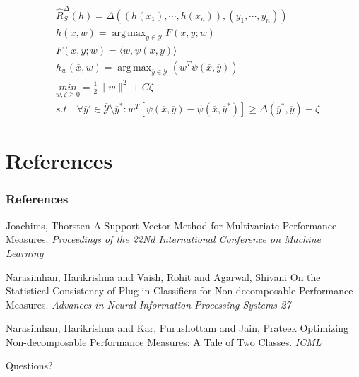 \documentclass{beamer}
\DeclareMathOperator*{\argmax}{arg\,max}
\begin{document}

\begin{frame}
	\frametitle{}
	\begin{equation*}
	\begin{split}
	& \hat{R}_S^\Delta(h) = \Delta ((h(x_1), \cdots, h(x_n)), (y_1, \cdots, y_n))\\
	& h(x,w) = \argmax_{y\in\mathcal{Y}}F(x,y;w)\\
	& F(x,y;w)=\langle w,\psi(x,y)\rangle\\
	& h_w(\overline{x},w)=\argmax_{\overline{y}\in\mathcal{Y}}(w^T\psi({\overline{x},\overline{y}}))\\
	& \underset{w,\zeta \geq 0}{min}= \frac{1}{2}\|w\|^2+C\zeta\\
	& s.t \quad \forall\overline{y}' \in \overline{\mathcal{Y}}\setminus\overline{y}^*:w^T[\psi(\overline{x},\overline{y})- \psi(\overline{x},\overline{y}^*)]\geq \Delta(\overline{y}^*,\overline{y})-\zeta
	\end{split}
	\end{equation*}
\end{frame}


\section{References} %

\begin{frame}
	\frametitle{References}
	\footnotesize{
		\begin{thebibliography}{99} %
			 Joachims, Thorsten
			\newblock A Support Vector Method for Multivariate Performance Measures.
			\newblock \emph{Proceedings of the 22Nd International Conference on Machine Learning}
			
			
			 Narasimhan, Harikrishna and Vaish, Rohit and Agarwal, Shivani
			\newblock On the Statistical Consistency of Plug-in Classifiers for Non-decomposable Performance Measures.
			\newblock \emph{Advances in Neural Information Processing Systems 27}
			
			 Narasimhan, Harikrishna and Kar, Purushottam and Jain, Prateek
			\newblock Optimizing Non-decomposable Performance Measures: A Tale of Two Classes.
			\newblock \emph{ICML}
			
			
			
		\end{thebibliography}
	}
\end{frame}


\begin{frame}
	\Huge{\centerline{Questions?}}
\end{frame}

\end{document}
